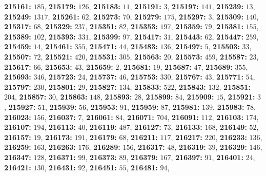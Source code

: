 \textsf{\bfseries 215161:} $185$, \textsf{\bfseries 215179:} $126$, \textsf{\bfseries 215183:} $11$, \textsf{\bfseries 215191:} $3$, \textsf{\bfseries 215197:} $141$, \textsf{\bfseries 215239:} $13$, \textsf{\bfseries 215249:} $1317$, \textsf{\bfseries 215261:} $62$, \textsf{\bfseries 215273:} $70$, \textsf{\bfseries 215279:} $175$, \textsf{\bfseries 215297:} $3$, \textsf{\bfseries 215309:} $140$, \textsf{\bfseries 215317:} $68$, \textsf{\bfseries 215329:} $237$, \textsf{\bfseries 215351:} $82$, \textsf{\bfseries 215353:} $197$, \textsf{\bfseries 215359:} $79$, \textsf{\bfseries 215381:} $155$, \textsf{\bfseries 215389:} $102$, \textsf{\bfseries 215393:} $331$, \textsf{\bfseries 215399:} $97$, \textsf{\bfseries 215417:} $31$, \textsf{\bfseries 215443:} $62$, \textsf{\bfseries 215447:} $259$, \textsf{\bfseries 215459:} $14$, \textsf{\bfseries 215461:} $355$, \textsf{\bfseries 215471:} $44$, \textsf{\bfseries 215483:} $136$, \textsf{\bfseries 215497:} $5$, \textsf{\bfseries 215503:} $33$, \textsf{\bfseries 215507:} $72$, \textsf{\bfseries 215521:} $420$, \textsf{\bfseries 215531:} $305$, \textsf{\bfseries 215563:} $20$, \textsf{\bfseries 215573:} $459$, \textsf{\bfseries 215587:} $23$, \textsf{\bfseries 215617:} $66$, \textsf{\bfseries 215653:} $43$, \textsf{\bfseries 215659:} $2$, \textsf{\bfseries 215681:} $19$, \textsf{\bfseries 215687:} $47$, \textsf{\bfseries 215689:} $355$, \textsf{\bfseries 215693:} $346$, \textsf{\bfseries 215723:} $24$, \textsf{\bfseries 215737:} $46$, \textsf{\bfseries 215753:} $330$, \textsf{\bfseries 215767:} $43$, \textsf{\bfseries 215771:} $54$, \textsf{\bfseries 215797:} $230$, \textsf{\bfseries 215801:} $29$, \textsf{\bfseries 215827:} $134$, \textsf{\bfseries 215833:} $522$, \textsf{\bfseries 215843:} $132$, \textsf{\bfseries 215851:} $204$, \textsf{\bfseries 215857:} $30$, \textsf{\bfseries 215863:} $148$, \textsf{\bfseries 215893:} $28$, \textsf{\bfseries 215899:} $84$, \textsf{\bfseries 215909:} $15$, \textsf{\bfseries 215921:} $3$, \textsf{\bfseries 215927:} $51$, \textsf{\bfseries 215939:} $56$, \textsf{\bfseries 215953:} $91$, \textsf{\bfseries 215959:} $87$, \textsf{\bfseries 215981:} $139$, \textsf{\bfseries 215983:} $78$, \textsf{\bfseries 216023:} $156$, \textsf{\bfseries 216037:} $7$, \textsf{\bfseries 216061:} $84$, \textsf{\bfseries 216071:} $704$, \textsf{\bfseries 216091:} $112$, \textsf{\bfseries 216103:} $174$, \textsf{\bfseries 216107:} $194$, \textsf{\bfseries 216113:} $40$, \textsf{\bfseries 216119:} $487$, \textsf{\bfseries 216127:} $73$, \textsf{\bfseries 216133:} $168$, \textsf{\bfseries 216149:} $52$, \textsf{\bfseries 216157:} $19$, \textsf{\bfseries 216173:} $191$, \textsf{\bfseries 216179:} $68$, \textsf{\bfseries 216211:} $117$, \textsf{\bfseries 216217:} $220$, \textsf{\bfseries 216233:} $136$, \textsf{\bfseries 216259:} $163$, \textsf{\bfseries 216263:} $176$, \textsf{\bfseries 216289:} $156$, \textsf{\bfseries 216317:} $48$, \textsf{\bfseries 216319:} $39$, \textsf{\bfseries 216329:} $146$, \textsf{\bfseries 216347:} $128$, \textsf{\bfseries 216371:} $99$, \textsf{\bfseries 216373:} $89$, \textsf{\bfseries 216379:} $167$, \textsf{\bfseries 216397:} $91$, \textsf{\bfseries 216401:} $24$, \textsf{\bfseries 216421:} $130$, \textsf{\bfseries 216431:} $92$, \textsf{\bfseries 216451:} $55$, \textsf{\bfseries 216481:} $94$, 
